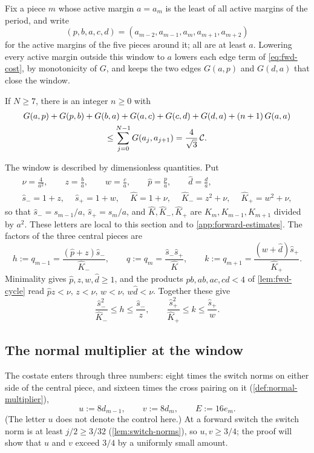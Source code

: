 Fix a piece $m$ whose active margin $a=a_m$ is the least of all active margins of the period, and
write
\[
(p,b,a,c,d)=(a_{m-2},a_{m-1},a_m,a_{m+1},a_{m+2})
\]
for the active margins of the five pieces around it; all are at least $a$. Lowering every active
margin outside this window to $a$ lowers each edge term of \eqref{eq:fwd-cost}, by monotonicity of
$G$, and keeps the two edges $G(a,p)$ and $G(d,a)$ that close the window.

\begin{lemma}\label{lem:fwd-seven}
If $N\ge7$, there is an integer $n\ge0$ with
\begin{multline*}
G(a,p)+G(p,b)+G(b,a)+G(a,c)+G(c,d)+G(d,a)+(n+1)\,G(a,a)\\
\le\sum_{j=0}^{N-1}G(a_j,a_{j+1})=\frac{4}{\sqrt3}\,\mathcal{C} .
\end{multline*}
\end{lemma}

The window is described by dimensionless quantities. Put
\begin{gather*}
\nu=\frac4{a^2},\qquad z=\frac ba,\qquad w=\frac ca,\qquad \hat p=\frac pa,\qquad \hat d=\frac da,\\
\hat s_-=1+z,\quad\ \hat s_+=1+w,\quad\ \hat K=1+\nu,\quad\ \hat K_-=z^2+\nu,\quad\ \hat K_+=w^2+\nu,
\end{gather*}
so that $\hat s_-=s_{m-1}/a$, $\hat s_+=s_m/a$, and $\hat K,\hat K_-,\hat K_+$ are
$K_m,K_{m-1},K_{m+1}$ divided by $a^2$. These letters are local to this section and to
\cref{app:forward-estimates}. The factors of the three central pieces are
\[
h:=q_{m-1}=\frac{(\hat p+z)\hat s_-}{\hat K_-},\qquad
q:=q_m=\frac{\hat s_-\hat s_+}{\hat K},\qquad
k:=q_{m+1}=\frac{(w+\hat d)\hat s_+}{\hat K_+}.
\]
Minimality gives $\hat p,z,w,\hat d\ge1$, and the products $pb,ab,ac,cd<4$ of
\cref{lem:fwd-cycle} read $\hat pz<\nu$, $z<\nu$, $w<\nu$, $w\hat d<\nu$. Together these give
\begin{equation}\label{eq:fwd-factor-range}
\frac{\hat s_-^2}{\hat K_-}\le h\le\frac{\hat s_-}{z},\qquad
\frac{\hat s_+^2}{\hat K_+}\le k\le\frac{\hat s_+}{w}.
\end{equation}

\subsection{The normal multiplier at the window}

The costate enters through three numbers: eight times the switch norms on either side of the
central piece, and sixteen times the cross pairing on it (\cref{def:normal-multiplier}),
\[
u:=8d_{m-1},\qquad v:=8d_m,\qquad E:=16e_m .
\]
(The letter $u$ does not denote the control here.) At a forward switch the switch norm is at least
$j/2\ge3/32$ (\cref{lem:switch-norms}), so $u,v\ge3/4$; the proof will show that $u$ and $v$ exceed
$3/4$ by a uniformly small amount.

